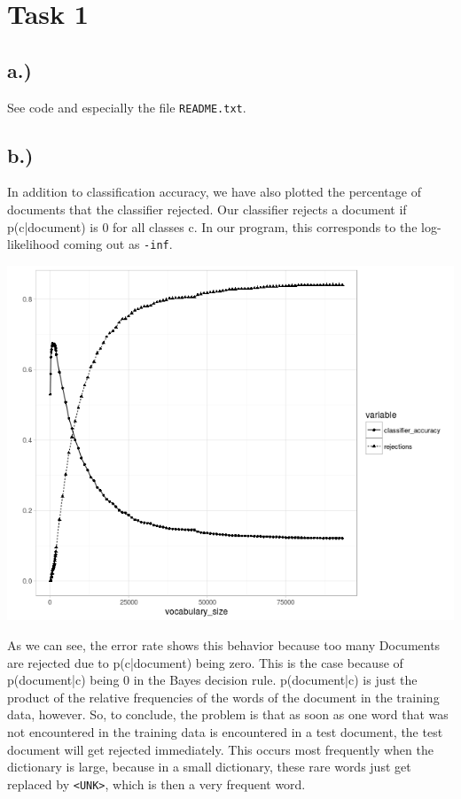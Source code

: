 \documentclass[%
   11pt,              %
   ngerman,           %
   a4paper,           %
   DIV11,             %
]{scrartcl}%
\begin{document}
\section*{Task 1}
\subsection*{a.)}

See code and especially the file \texttt{README.txt}.

\subsection*{b.)}

In addition to classification accuracy, we have also plotted the percentage
of documents that the classifier rejected. Our classifier rejects a document
if p(c|document) is 0 for all classes c. In our program, this corresponds to the log-likelihood coming out as \texttt{-inf}.

\includegraphics[width=\textwidth]{exercise03.1/accuracy_naive.png}

As we can see, the error rate shows this behavior because too many Documents are rejected due to p(c|document) being zero. This is the case because of p(document|c) being 0 in the Bayes decision rule. p(document|c) is just the product of the relative frequencies of the words of the document in the training data, however. So, to conclude, the problem is that as soon as one word that was not encountered in the training data is encountered in a test document, the test document will get rejected immediately. This occurs most frequently when the dictionary is large, because in a small dictionary, these rare words just get replaced by \texttt{<UNK>}, which is then a very frequent word.
\end{document}
